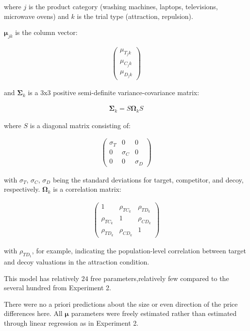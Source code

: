 where $j$ is the product category (washing machines, laptops, televisions, microwave ovens) and $k$ is the trial type (attraction, repulsion). 

$\boldsymbol{\mu}_{jk}$ is the column vector:

\begin{align}
   \begin{pmatrix}
      \mu_{T_jk} \\
      \mu_{C_jk} \\
      \mu_{D_jk}
\end{pmatrix}
   \label{eqn:mu_price}
\end{align}

and $\boldsymbol{\Sigma}_{k}$ is a $3\text{x}3$ positive semi-definite variance-covariance matrix:

\begin{align}
   \boldsymbol{\Sigma}_{k}=S\boldsymbol{\Omega}_{k}S
\end{align}

where $S$ is a diagonal matrix consisting of: 

\begin{align}
   \begin{pmatrix}
      \sigma_{T} & 0 & 0 \\
      0 & \sigma_{C} & 0 \\
      0 & 0 & \sigma_{D} 
   \end{pmatrix}
\end{align}

with $\sigma_{T}$, $\sigma_{C}$, $\sigma_{D}$ being the standard deviations for target, competitor, and decoy, respectively. $\boldsymbol{\Omega}_{k}$ is a correlation matrix:

\begin{align}
   \begin{pmatrix}
      1 & \rho_{TC_k} & \rho_{TD_k} \\
      \rho_{TC_k} & 1 & \rho_{CD_k} \\
      \rho_{TD_k} & \rho_{CD_k} & 1 
   \end{pmatrix}
\end{align}

with $\rho_{TD_1}$, for example, indicating the population-level correlation between target and decoy valuations in the attraction condition.

This model has relatively $24$ free parameters,relatively few compared to the several hundred from Experiment 2.

There were no a priori predictions about the size or even direction of the price differences here. All $\boldsymbol{\mu}$ parameters were freely estimated rather than estimated through linear regression as in Experiment 2.

